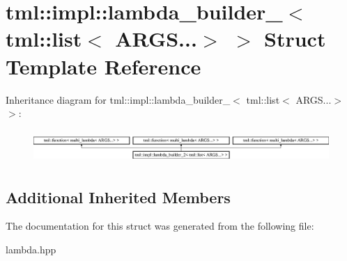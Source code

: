 \hypertarget{structtml_1_1impl_1_1lambda__builder__2_3_01tml_1_1list_3_01ARGS_8_8_8_4_01_4}{\section{tml\+:\+:impl\+:\+:lambda\+\_\+builder\+\_$<$ tml\+:\+:list$<$ A\+R\+G\+S...$>$ $>$ Struct Template Reference}
\label{structtml_1_1impl_1_1lambda__builder__2_3_01tml_1_1list_3_01ARGS_8_8_8_4_01_4}
}
Inheritance diagram for tml\+:\+:impl\+:\+:lambda\+\_\+builder\+\_$<$ tml\+:\+:list$<$ A\+R\+G\+S...$>$ $>$\+:\begin{figure}[H]
\begin{center}
\leavevmode
\includegraphics[height=1.269841cm]{structtml_1_1impl_1_1lambda__builder__2_3_01tml_1_1list_3_01ARGS_8_8_8_4_01_4}
\end{center}
\end{figure}
\subsection*{Additional Inherited Members}


The documentation for this struct was generated from the following file\+:\begin{DoxyCompactItemize}
\item 
lambda.\+hpp\end{DoxyCompactItemize}
